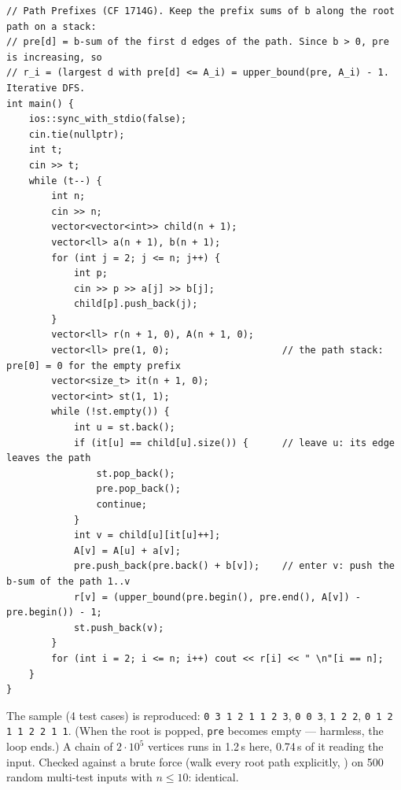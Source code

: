 \begin{solutionbox}
\begin{lstlisting}[style=cpp]
// Path Prefixes (CF 1714G). Keep the prefix sums of b along the root path on a stack:
// pre[d] = b-sum of the first d edges of the path. Since b > 0, pre is increasing, so
// r_i = (largest d with pre[d] <= A_i) = upper_bound(pre, A_i) - 1. Iterative DFS.
int main() {
    ios::sync_with_stdio(false);
    cin.tie(nullptr);
    int t;
    cin >> t;
    while (t--) {
        int n;
        cin >> n;
        vector<vector<int>> child(n + 1);
        vector<ll> a(n + 1), b(n + 1);
        for (int j = 2; j <= n; j++) {
            int p;
            cin >> p >> a[j] >> b[j];
            child[p].push_back(j);
        }
        vector<ll> r(n + 1, 0), A(n + 1, 0);
        vector<ll> pre(1, 0);                    // the path stack: pre[0] = 0 for the empty prefix
        vector<size_t> it(n + 1, 0);
        vector<int> st(1, 1);
        while (!st.empty()) {
            int u = st.back();
            if (it[u] == child[u].size()) {      // leave u: its edge leaves the path
                st.pop_back();
                pre.pop_back();
                continue;
            }
            int v = child[u][it[u]++];
            A[v] = A[u] + a[v];
            pre.push_back(pre.back() + b[v]);    // enter v: push the b-sum of the path 1..v
            r[v] = (upper_bound(pre.begin(), pre.end(), A[v]) - pre.begin()) - 1;
            st.push_back(v);
        }
        for (int i = 2; i <= n; i++) cout << r[i] << " \n"[i == n];
    }
}
\end{lstlisting}
The sample (4 test cases) is reproduced: \texttt{0 3 1 2 1 1 2 3}, \texttt{0 0 3}, \texttt{1 2 2}, \texttt{0 1 2 1 1 2 2 1 1}. (When the root is popped, \texttt{pre} becomes empty --- harmless, the loop ends.) A chain of $2\cdot10^5$ vertices runs in 1.2\,s here, 0.74\,s of it reading the input. Checked against a brute force (walk every root path explicitly, ) on 500 random multi-test inputs with $n \le 10$: identical.
\end{solutionbox}

